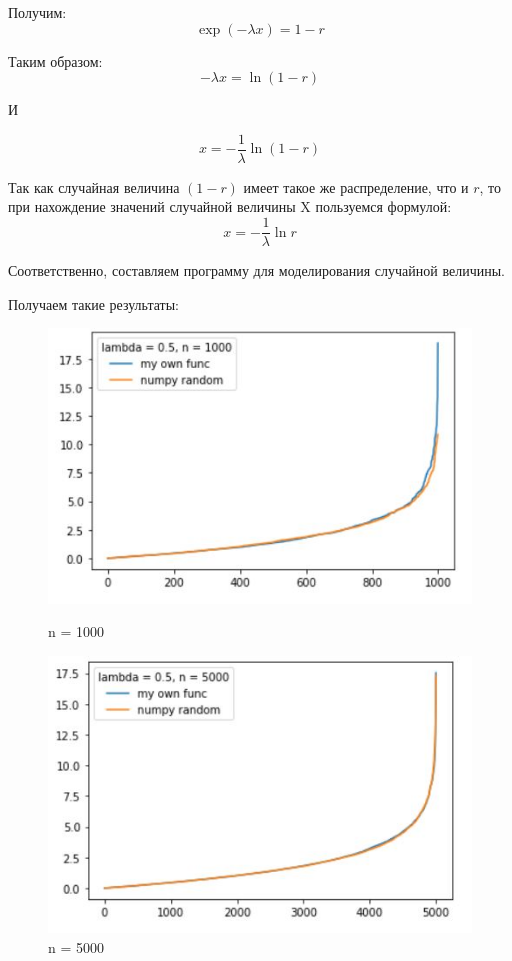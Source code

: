 \documentclass[a4paper,12pt, oneside]{book}
\begin{document}
{{Получим:
$$
\exp(- \lambda x) = 1 - r
$$

Таким образом:
$$
- \lambda x = \ln(1 - r)
$$

И

$$
x = -\frac{1}{\lambda} \ln(1 - r)
$$

Так как случайная величина $(1 - r)$ имеет такое же распределение, что и $r$, то при нахождение значений случайной величины X пользуемся формулой:
$$
x = - \frac{1}{\lambda} \ln r
$$

Соответственно, составляем программу для моделирования случайной величины.

Получаем такие результаты:

\begin{figure}[h]
	\begin{center}
		\begin{minipage}[h]{0.4\linewidth}
			\includegraphics[width=1\linewidth]{ex_1_1000.jpg}
			\caption{n = 1000} %
			\label{ris:experimoriginal} %
		\end{minipage}
		\hfill
		\begin{minipage}[h]{0.4\linewidth}
			\includegraphics[width=1\linewidth]{ex_1_5000.jpg}
			\caption{n = 5000}
			\label{ris:experimcoded}
		\end{minipage}
	\end{center}
\end{figure} 

}}
\end{document}
